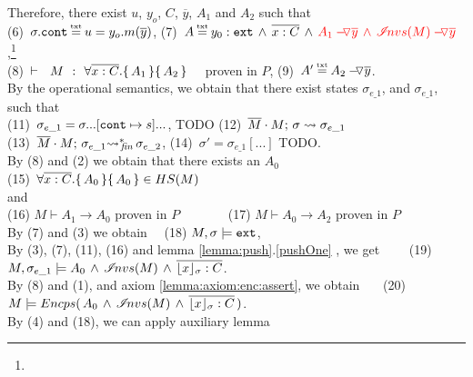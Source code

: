 \begin{description}
Therefore, there exist $u$, $y_o$, $C$, $\overline y$,  $A_1$ and $A_2$ such that \\
(6)\ $\sigma.\prg{cont}\txteq u=y_o.m(\overline y)$,  \hspace{2cm}
 (7)\ $A \txteq   { \external{y_0} }\, \wedge \, \overline {x:C}  \, \wedge \,  \red{\PushAS  {y}{  A_1} \,   \wedge \,  \PushAS {y}{\extract{M}}}\ $,\footnote{}
\\
 (8)\ ${\vdash \ \ M\ \ \mathbf{:}\ \ \forall {\overline {x:C}}.\{\, A_1 \,\}\{\, A_2 \,\}}$ \ \ proven in $P$,   \hspace{1cm}
 (9)\ $A' \txteq \PushAS  {y} { A_2}$. 
 \\
 By the operational semantics, we obtain that there exist states $\sigma_{e\_1}$, and $\sigma_{e\_1}$, such that \\
 (11)\ $\sigma_{e\_1}=\sigma ...[\mbox{\normalfont{\texttt{cont}}}\mapsto s]... $, TODO   \hspace{1cm}
   (12)\ $\overline{M}\cdot M;\, {\sigma} \rightsquigarrow \sigma_{e\_1}$ \\
 (13)\ $\overline{M}\cdot M;\, {\sigma_{e\_1}} {\rightsquigarrow^*}\!\!_{\mathit{fin}}\, \sigma_{e\_2}$,   \hspace{1cm}
 (14)\ $\sigma'=\sigma_{e\_1}[...]$ TODO.
\\
By (8) and (2) we obtain that there exists an $A_0$ \\
(15)\ $\forall {\overline {x:C}}.\{\, A_0 \,\}\{\, A_0 \,\} \in HS(M)$\\ and \\
 (16) $M \vdash A_1 \rightarrow A_0$ proven in $P$ \ \ \ \ \ \ \  (17) $M \vdash A_0 \rightarrow A_2$ proven in $P$ \\
By (7) and (3) we obtain \ \ 
(18) $M, \sigma \models \mbox{\normalfont{\texttt{ext}}}$, %
\\
By (3), (7), (11), (16) and lemma  \ref{lemma:push}.\ref{pushOne} , we get \ \ \ \  (19) $M, \sigma_{e\_1} \models  {  A_0} \,   \wedge \,  {{\mathcal I}\!nvs(M)} \, \wedge \, 
\overline{ {\lfloor x \rfloor_{\sigma}} : C}$.
\\
By (8) and (1), and axiom \ref{lemma:axiom:enc:assert}, we obtain \ \ \ (20) \ $M \models {\ensuremath Encps(\, {  A_0} \,   \wedge \,  {\ensuremath{{\mathcal I}\!nvs(M)}} \, \wedge \, 
\overline{ {\lfloor x \rfloor_{\sigma}} : C}\, )}$.
\\
By (4) and (18), we can apply auxiliary lemma 

\end{description}
